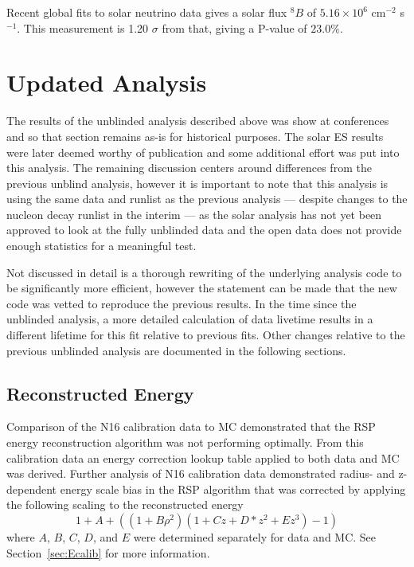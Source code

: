 Recent global fits to solar neutrino data gives a solar flux $^{8}B$ of
$5.16 \times 10^6$ cm$^{-2}$ s$^{-1}$.
This measurement is 1.20 $\sigma$ from that, giving a P-value of $23.0\%$.


\section{Updated Analysis}
\label{sec:solar:updated}
The results of the unblinded analysis described above was show at conferences and so that section remains as-is for historical purposes. 
The solar ES results were later deemed worthy of publication and some additional effort was put into this analysis.
The remaining discussion centers around differences from the previous unblind analysis, however it is important to note that this analysis is using the same data and runlist as the previous analysis --- despite changes to the nucleon decay runlist in the interim --- as the solar analysis has not yet been approved to look at the fully unblinded data and the open data does not provide enough statistics for a meaningful test.

Not discussed in detail is a thorough rewriting of the underlying analysis code to be significantly more efficient, however the statement can be made that the new code was vetted to reproduce the previous results.
In the time since the unblinded analysis, a more detailed calculation of data livetime results in a different lifetime for this fit relative to previous fits.
Other changes relative to the previous unblinded analysis are documented in the following sections.


\subsection{Reconstructed Energy}
Comparison of the N16 calibration data to MC demonstrated that the RSP energy reconstruction algorithm was not performing optimally.
From this calibration data an energy correction lookup table applied to both data and MC was derived.
Further analysis of N16 calibration data demonstrated radius- and z-dependent energy scale bias in the RSP algorithm that was corrected by applying the following scaling to the reconstructed energy
\begin{equation}
1 + A + ( (1 + B \rho^2)(1 + Cz + D*z^2 + Ez^3) - 1 )
\end{equation}
where $A$, $B$, $C$, $D$, and $E$ were determined separately for data and MC.
See Section~\ref{sec:Ecalib} for more information.

